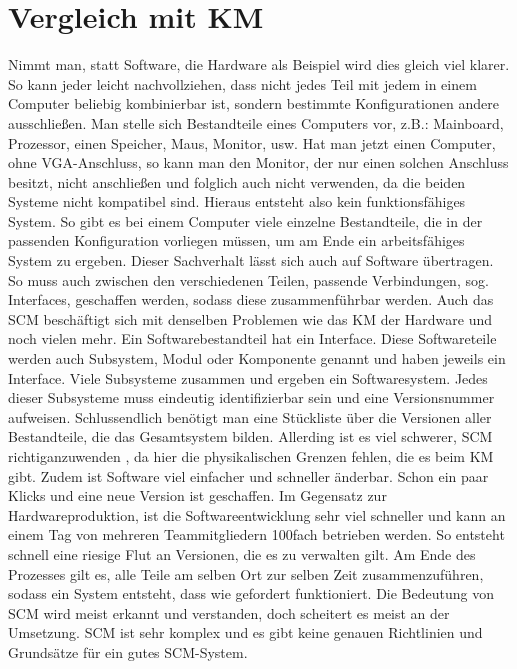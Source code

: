\section{Vergleich mit KM}
Nimmt man, statt Software, die Hardware als Beispiel wird dies gleich viel klarer. So kann jeder leicht nachvollziehen, dass nicht jedes Teil mit jedem in einem Computer beliebig kombinierbar ist, sondern bestimmte Konfigurationen andere ausschließen. Man stelle sich Bestandteile eines Computers vor, z.B.: Mainboard, Prozessor, einen Speicher, Maus, Monitor, usw. Hat man jetzt einen Computer, ohne VGA-Anschluss, so kann man den Monitor, der nur einen solchen Anschluss besitzt, nicht anschließen und folglich auch nicht verwenden, da die beiden Systeme nicht kompatibel sind. Hieraus entsteht also kein funktionsfähiges System. So gibt es bei einem Computer viele einzelne Bestandteile, die in der passenden Konfiguration vorliegen müssen, um am Ende ein arbeitsfähiges System zu ergeben. Dieser Sachverhalt lässt sich auch auf Software übertragen. So muss auch zwischen den verschiedenen Teilen, passende Verbindungen, sog. Interfaces, geschaffen werden, sodass diese zusammenführbar werden. Auch das SCM beschäftigt sich mit denselben Problemen wie das KM der Hardware und noch vielen mehr. Ein Softwarebestandteil hat ein Interface. 
Diese Softwareteile werden auch Subsystem, Modul oder Komponente genannt und haben jeweils ein Interface. Viele Subsysteme zusammen und ergeben ein Softwaresystem. Jedes dieser Subsysteme muss eindeutig identifizierbar sein und eine Versionsnummer aufweisen. Schlussendlich benötigt man eine Stückliste über die Versionen aller Bestandteile, die das Gesamtsystem bilden. Allerding ist es viel schwerer, SCM \Gu richtig\Go anzuwenden , da hier die physikalischen Grenzen fehlen, die es beim KM gibt. Zudem ist Software viel einfacher und schneller änderbar. Schon ein paar Klicks und eine neue Version ist geschaffen. Im  Gegensatz zur Hardwareproduktion, ist die Softwareentwicklung sehr viel schneller und kann an einem Tag von mehreren Teammitgliedern 100fach  betrieben werden. So entsteht schnell eine riesige Flut an Versionen, die es zu verwalten gilt. Am Ende des Prozesses gilt es, alle Teile am selben Ort zur selben Zeit zusammenzuführen, sodass ein System entsteht, dass wie gefordert funktioniert. Die Bedeutung von SCM wird meist erkannt und verstanden, doch scheitert es meist an der Umsetzung. SCM ist sehr komplex und es gibt keine genauen Richtlinien und Grundsätze für ein gutes SCM-System. 

